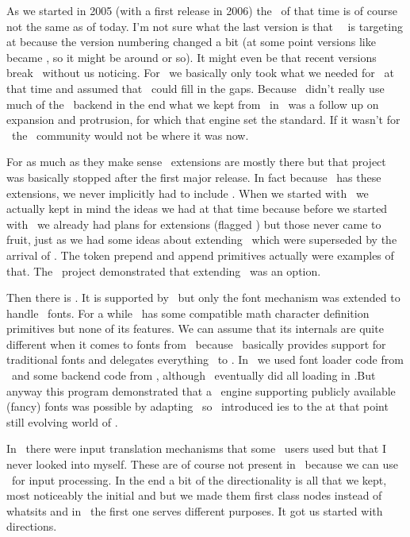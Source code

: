 As we started in 2005 (with a first release in 2006) the \PDFTEX\ of that time is
of course not the same as of today. I'm not sure what the last version is that
\CONTEXT\ \MKII\ is targeting at because the version numbering changed a bit (at
some point versions like  became , so it might be
around or so). It might even be that recent versions break \MKII\
without us noticing. For \LUATEX\ we basically only took what we needed for
\CONTEXT\ at that time and assumed that \LUA\ could fill in the gaps. Because
\CONTEXT\ didn't really use much of the \LUATEX\ backend in the end what we kept
from \PDFTEX\ in \LUAMETATEX\ was a follow up on expansion and protrusion, for
which that engine set the standard. If it wasn't for \PDFTEX\ the \TEX\ community
would not be where it was now.

For as much as they make sense \ETEX\ extensions are mostly there but that
project was basically stopped after the first major release. In fact because
\PDFTEX\ has these extensions, we never implicitly had to include \ETEX. When we
started with \LUATEX\ we actually kept in mind the ideas we had at that time
because before we started with \LUATEX\ we already had plans for extensions
(flagged \type {eetex}) but those never came to fruit, just as we had some ideas
about extending \DVI\ which were superseded by the arrival of \PDF. The token
prepend and append primitives actually were examples of that. The \ETEX\ project
demonstrated that extending \TEX\ was an option.

Then there is \XETEX. It is supported by \MKII\ but only the font mechanism was
extended to handle \OPENTYPE\ fonts. For a while \LUATEX\ has some compatible
math character definition primitives but none of its features. We can assume that
its internals are quite different when it comes to fonts from \LUATEX\ because
\LUATEX\ basically provides support for traditional fonts and delegates
everything \OPENTYPE\ to \LUA. In \LUATEX\ we used font loader code from
\FONTFORGE\ and some backend code from \DVIPDFMX, although \CONTEXT\ eventually
did all loading in \LUA .But anyway this program demonstrated that a \UNICODE\
engine supporting publicly available (fancy) fonts was possible by adapting \TEX\
so \XETEX\ introduced \TEX ies to the at that point still evolving world of
\OPENTYPE.

In \OMEGA\ there were input translation mechanisms that some \CONTEXT\ users used
but that I never looked into myself. These are of course not present in \LUATEX\
because we can use \LUA\ for input processing. In the end a bit of the
directionality is all that we kept, most noticeably the initial 
and \type {dirnode} but we made them first class nodes instead of whatsits and in
\LUAMETATEX\ the first one serves different purposes. It got us started with
directions.

